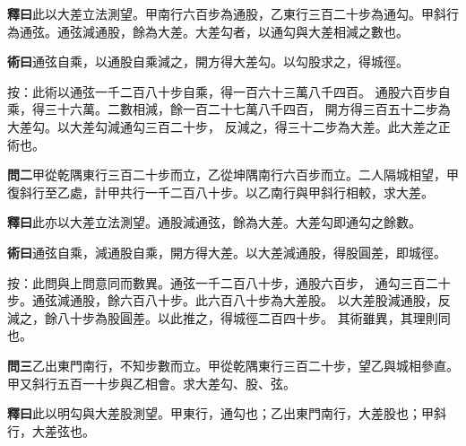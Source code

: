 \documentclass[12pt,a4paper]{article}
\begin{document}
\vspace{0.3em}

\noindent\textbf{釋曰}\quad 此以大差立法測望。甲南行六百步為通股，乙東行三百二十步為通勾。甲斜行為通弦。通弦減通股，餘為大差。大差勾者，以通勾與大差相減之數也。

\vspace{0.3em}

\noindent\textbf{術曰}\quad 通弦自乘，以通股自乘減之，開方得大差勾。以勾股求之，得城徑。

\vspace{0.3em}

\noindent
按：此術以通弦一千二百八十步自乘，得一百六十三萬八千四百。
通股六百步自乘，得三十六萬。二數相減，餘一百二十七萬八千四百，
開方得三百五十二步為大差勾。以大差勾減通勾三百二十步，
反減之，得三十二步為大差。此大差之正術也。

\vspace{0.5em}

\noindent\textbf{問二}\quad 甲從乾隅東行三百二十步而立，乙從坤隅南行六百步而立。二人隔城相望，甲復斜行至乙處，計甲共行一千二百八十步。以乙南行與甲斜行相較，求大差。

\vspace{0.3em}

\noindent\textbf{釋曰}\quad 此亦以大差立法測望。通股減通弦，餘為大差。大差勾即通勾之餘數。

\vspace{0.3em}

\noindent\textbf{術曰}\quad 通弦自乘，減通股自乘，開方得大差。以大差減通股，得股圓差，即城徑。

\vspace{0.3em}

\noindent
按：此問與上問意同而數異。通弦一千二百八十步，通股六百步，
通勾三百二十步。通弦減通股，餘六百八十步。此六百八十步為大差股。
以大差股減通股，反減之，餘八十步為股圓差。以此推之，得城徑二百四十步。
其術雖異，其理則同也。

\vspace{0.5em}

\noindent\textbf{問三}\quad 乙出東門南行，不知步數而立。甲從乾隅東行三百二十步，望乙與城相參直。甲又斜行五百一十步與乙相會。求大差勾、股、弦。

\vspace{0.3em}

\noindent\textbf{釋曰}\quad 此以明勾與大差股測望。甲東行，通勾也；乙出東門南行，大差股也；甲斜行，大差弦也。

\vspace{0.3em}
\end{document}
